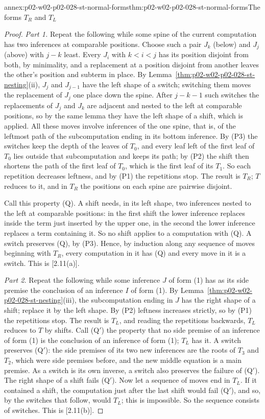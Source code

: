 \begin{annexitem}{annex:p02-w02-p02-028-st-normal-forms}{thm:p02-w02-p02-028-st-normal-forms}{The forms \(T_R\) and \(T_L\)}
\begin{proof}
\emph{Part 1.}  Repeat the following while some spine of the current
computation has two inferences at comparable positions.  Choose such a pair
\(J_k\) (below) and \(J_j\) (above) with \(j-k\) least.  Every \(J_i\) with
\(k<i<j\) has its position disjoint from both, by minimality, and a
replacement at a position disjoint from another leaves the other's position
and subterm in place.  By Lemma~\ref{thm:p02-w02-p02-028-st-nesting}(ii),
\(J_j\) and \(J_{j-1}\) have the left shape of a switch; switching them moves
the replacement of \(J_j\) one place down the spine.  After \(j-k-1\) such
switches the replacements of \(J_j\) and \(J_k\) are adjacent and nested to
the left at comparable positions, so by the same lemma they have the left
shape of a shift, which is applied.  All these moves involve inferences of
the one spine, that is, of the leftmost path of the subcomputation ending in
its bottom inference.  By (P3) the switches keep the depth of the leaves of
\(T_0\), and every leaf left of the first leaf of \(T_0\) lies outside that
subcomputation and keeps its path; by (P2) the shift then shortens the path of
the first leaf of \(T_0\), which is the first leaf of its \(T_1\).  So each
repetition decreases leftness, and by (P1) the repetitions stop.  The result
is \(T_R\); \(T\) reduces to it, and in \(T_R\) the positions on each spine
are pairwise disjoint.

Call this property (Q).  A shift needs, in its left shape, two inferences
nested to the left at comparable positions: in the first shift the lower
inference replaces inside the term just inserted by the upper one, in the
second the lower inference replaces a term containing it.  So no shift
applies to a computation with (Q).  A switch preserves (Q), by (P3).  Hence,
by induction along any sequence of moves beginning with \(T_R\), every
computation in it has (Q) and every move in it is a switch.  This is
[2.11(a)].

\emph{Part 2.}  Repeat the following while some inference \(J\) of form (1)
has as its side premise the conclusion of an inference \(I\) of form (1).  By
Lemma~\ref{thm:p02-w02-p02-028-st-nesting}(iii), the subcomputation ending
in \(J\) has the right shape of a shift; replace it by the left shape.  By
(P2) leftness increases strictly, so by (P1) the repetitions stop.  The
result is \(T_L\), and reading the repetitions backwards, \(T_L\) reduces to
\(T\) by shifts.  Call (Q\('\)) the property that no side premise of an
inference of form (1) is the conclusion of an inference of form (1); \(T_L\)
has it.  A switch preserves (Q\('\)): the side premises of its two new
inferences are the roots of \(T_3\) and \(T_2\), which were side premises
before, and the new middle equation is a main premise.  As a switch is its
own inverse, a switch also preserves the failure of (Q\('\)).  The right
shape of a shift fails (Q\('\)).  Now let a sequence of moves end in \(T_L\).
If it contained a shift, the computation just after the last shift would
fail (Q\('\)), and so, by the switches that follow, would \(T_L\); this is
impossible.  So the sequence consists of switches.  This is [2.11(b)].


\end{proof}
\end{annexitem}
